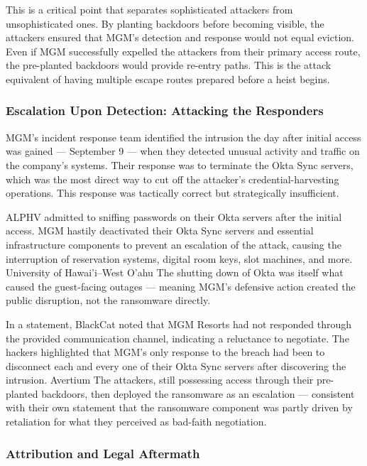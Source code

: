 This is a critical point that separates sophisticated attackers from unsophisticated ones. By planting backdoors before becoming visible, the attackers ensured that MGM's detection and response would not equal eviction. Even if MGM successfully expelled the attackers from their primary access route, the pre-planted backdoors would provide re-entry paths. This is the attack equivalent of having multiple escape routes prepared before a heist begins.

\subsubsection{Escalation Upon Detection: Attacking the Responders}

MGM's incident response team identified the intrusion the day after initial access was gained — September 9 — when they detected unusual activity and traffic on the company's systems. Their response was to terminate the Okta Sync servers, which was the most direct way to cut off the attacker's credential-harvesting operations. This response was tactically correct but strategically insufficient.

ALPHV admitted to sniffing passwords on their Okta servers after the initial access. MGM hastily deactivated their Okta Sync servers and essential infrastructure components to prevent an escalation of the attack, causing the interruption of reservation systems, digital room keys, slot machines, and more. University of Hawai'i--West O'ahu The shutting down of Okta was itself what caused the guest-facing outages — meaning MGM's defensive action created the public disruption, not the ransomware directly.

In a statement, BlackCat noted that MGM Resorts had not responded through the provided communication channel, indicating a reluctance to negotiate. The hackers highlighted that MGM's only response to the breach had been to disconnect each and every one of their Okta Sync servers after discovering the intrusion. Avertium The attackers, still possessing access through their pre-planted backdoors, then deployed the ransomware as an escalation — consistent with their own statement that the ransomware component was partly driven by retaliation for what they perceived as bad-faith negotiation.

\subsubsection{Attribution and Legal Aftermath}

